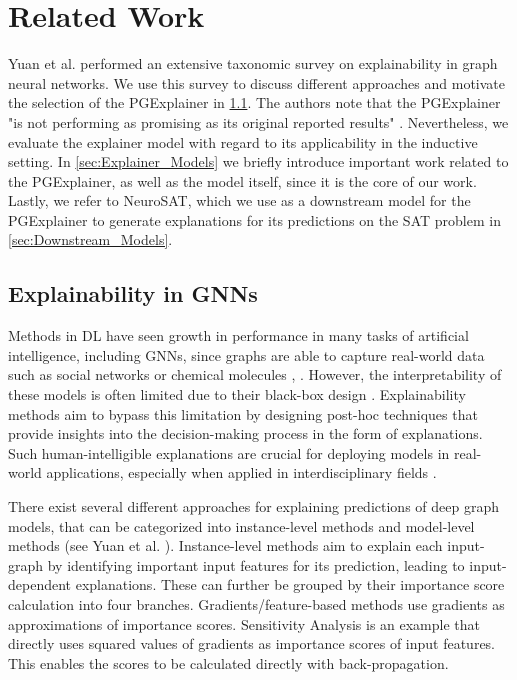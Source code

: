 \chapter{Related Work}

Yuan et al. \cite{yuan2022explainability} performed an extensive taxonomic survey on explainability in graph neural networks. We use this survey to discuss different approaches and motivate the selection of the PGExplainer in \ref{sec:gnn_explainability}. The authors note that the PGExplainer "is not performing as promising as its original reported results" \cite{yuan2022explainability}. Nevertheless, we evaluate the explainer model with regard to its applicability in the inductive setting. In \ref{sec:Explainer_Models} we briefly introduce important work related to the PGExplainer, as well as the model itself, since it is the core of our work. Lastly, we refer to NeuroSAT, which we use as a downstream model for the PGExplainer to generate explanations for its predictions on the SAT problem in \ref{sec:Downstream_Models}.

\section{Explainability in GNNs}
\label{sec:gnn_explainability}

Methods in DL have seen growth in performance in many tasks of artificial intelligence, including GNNs, since graphs are able to capture real-world data such as social networks or chemical molecules \cite{ying2018graph}, \cite{ma2021deep}. However, the interpretability of these models is often limited due to their black-box design \cite{noor2024survey}. Explainability methods aim to bypass this limitation by designing post-hoc techniques that provide insights into the decision-making process in the form of explanations. Such human-intelligible explanations are crucial for deploying models in real-world applications, especially when applied in interdisciplinary fields \cite{ribeiro2016should}.

There exist several different approaches for explaining predictions of deep graph models, that can be categorized into instance-level methods and model-level methods (see Yuan et al.  \cite{yuan2022explainability}). Instance-level methods aim to explain each input-graph by identifying important input features for its prediction, leading to input-dependent explanations. These can further be grouped by their importance score calculation into four branches. Gradients/feature-based methods use gradients as approximations of importance scores. Sensitivity Analysis \cite{baldassarre2019explainability} is an example that directly uses squared values of gradients as importance scores of input features. This enables the scores to be calculated directly with back-propagation.

